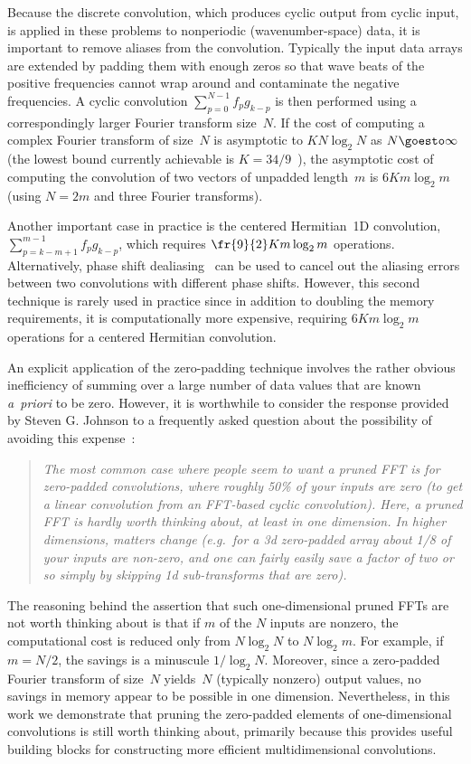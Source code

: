 \documentclass[final]{siamltex}
\begin{document}
Because the discrete convolution, which produces cyclic output from cyclic
input, is applied in these problems to nonperiodic (wavenumber-space) data,
it is important
to remove aliases from the convolution. Typically the input data arrays are
extended by padding them with enough zeros so that wave beats of
the positive frequencies cannot wrap around and contaminate
the negative frequencies. A cyclic convolution $\sum_{p=0}^{N-1} f_p g_{k-p}$ 
is then performed using a
correspondingly larger Fourier transform size~$N$. If the cost of 
computing a complex Fourier transform of size~$N$ is asymptotic to 
$K N\log_2 N$ as \hbox{$N\goesto\infty$} (the lowest bound currently 
achievable is $K=34/9$~\cite{Johnson07,Lundy07}), the asymptotic cost of
computing the convolution of two vectors of unpadded length~$m$ is
$6Km\log_2 m$ (using $N=2m$ and three Fourier transforms).

Another important case in practice is the centered Hermitian~1D convolution,
$\sum_{p=k-m+1}^{m-1} f_p g_{k-p}$, which requires $\fr{9}{2}Km\log_2 m$
operations.
Alternatively, phase shift dealiasing~\cite{Patterson71,Canuto06} can be used
to cancel out the aliasing errors between two convolutions with
different phase shifts. However, this second technique is rarely used in
practice since in addition to doubling the memory requirements, it is
computationally more expensive, requiring $6K m\log_2 m$ operations for a 
centered Hermitian convolution.

An explicit application of the zero-padding technique involves the rather
obvious inefficiency of summing over a large number of data values that
are known {\it a~priori\/} to be zero.
However, it is worthwhile to consider the response
provided by Steven G. Johnson to a frequently asked question about the
possibility of avoiding this expense~\cite{fftwprune}:
\begin{quotation}\label{Johnson}
{\it
The most common case where people seem to want a pruned FFT is for
zero-padded convolutions, where roughly 50\% of your inputs are zero (to
get a linear convolution from an FFT-based cyclic convolution). Here, a
pruned FFT is hardly worth thinking about, at least in one dimension. In
higher dimensions, matters change (e.g.\ for a 3d zero-padded array about
1/8 of your inputs are non-zero, and one can fairly easily save a factor of
two or so simply by skipping 1d sub-transforms that are zero).
}
\end{quotation}

The reasoning behind the assertion that such one-dimensional pruned FFTs
are not worth thinking about is that if $m$ of the $N$ inputs are nonzero,
the computational cost is reduced only from $N\log_2 N$ to $N\log_2 m$.
For example, if $m=N/2$, the savings is a minuscule $1/\log_2 N$.
Moreover, since a zero-padded Fourier transform of size~$N$ yields~$N$
(typically nonzero) output values, no savings in memory appear to be
possible in one dimension. Nevertheless, in this work we demonstrate that
pruning the zero-padded elements of one-dimensional convolutions is still
worth thinking about, primarily because this provides useful building blocks
for constructing more efficient multidimensional convolutions.
\end{document}
